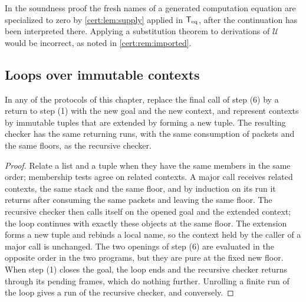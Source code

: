\begin{remark}
In the soundness proof the fresh names of a generated computation equation
are specialized to zero by \cref{cert:lem:supply} applied in $\mathsf{T}_{\mathrm{eq}}$, after
the continuation has been interpreted there. Applying a substitution theorem
to derivations of $\mathcal U$ would be incorrect, as noted in
\cref{cert:rem:imported}.
\end{remark}

\subsection{Loops over immutable contexts}

\begin{theorem}\label{cert:thm:loop}
In any of the protocols of this chapter, replace the final call of step (6) by
a return to step (1) with the new goal and the new context, and represent
contexts by immutable tuples that are extended by forming a new tuple. The
resulting checker has the same returning runs, with the same consumption of
packets and the same floors, as the recursive checker.
\end{theorem}
\begin{proof}
Relate a list and a tuple when they have the same members in the same order;
membership tests agree on related contexts. A major call receives related
contexts, the same stack and the same floor, and by induction on its run it
returns after consuming the same packets and leaving the same floor. The
recursive checker then calls itself on the opened goal and the extended
context; the loop continues with exactly these objects at the same floor. The
extension forms a new tuple and rebinds a local name, so the context held by
the caller of a major call is unchanged. The two openings of step (6) are
evaluated in the opposite order in the two programs, but they are pure at the
fixed new floor. When step (1) closes the goal, the loop ends and the
recursive checker returns through its pending frames, which do nothing
further. Unrolling a finite run of the loop gives a run of the recursive
checker, and conversely.
\end{proof}

